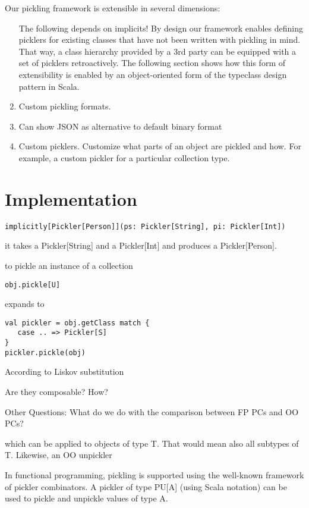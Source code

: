 \documentclass[preprint,10pt]{sigplanconf}
\begin{document}
Our pickling framework is extensible in several dimensions:

\begin{enumerate}
\item [The following depends on implicits!] By design our framework enables defining picklers for existing classes that have not been written with pickling in mind. That way, a class hierarchy provided by a 3rd party can be equipped with a set of picklers retroactively. The following section shows how this form of extensibility is enabled by an object-oriented form of the typeclass design pattern in Scala.
\item Custom pickling formats.
\item Can show JSON as alternative to default binary format
\item Custom picklers. Customize what parts of an object are pickled and how. For example, a custom pickler for a particular collection type.
\end{enumerate}

\section{Implementation}

\begin{verbatim}
implicitly[Pickler[Person]](ps: Pickler[String], pi: Pickler[Int])
\end{verbatim}

it takes a Pickler[String] and a Pickler[Int] and produces a Pickler[Person].

to pickle an instance of a collection

\begin{verbatim}
obj.pickle[U]
\end{verbatim}

expands to

\begin{verbatim}
val pickler = obj.getClass match {
   case .. => Pickler[S]
}
pickler.pickle(obj)
\end{verbatim}

According to Liskov substitution

Are they composable? How?

Other Questions:
What do we do with the comparison between FP PCs and OO PCs?


which can be applied to objects of type T. That would mean also all subtypes of T. Likewise, an OO unpickler


In functional programming, pickling is supported using the well-known framework of pickler combinators. A pickler of type PU[A] (using Scala notation) can be used to pickle and unpickle values of type A.
\end{document}
